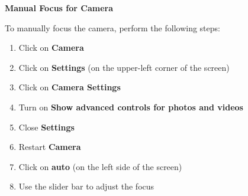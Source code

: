 \textbf{Manual Focus for Camera} \label{manual_focus}

To manually focus the camera, perform the following steps:

\begin{enumerate}
	\item Click on \textbf{Camera}

	\item Click on \textbf{Settings} (on the upper-left corner of the screen)

	\item Click on \textbf{Camera Settings}

	\item Turn on \textbf{Show advanced controls for photos and videos}

	\item Close \textbf{Settings}

	\item Restart \textbf{Camera}

	\item Click on \textbf{auto} (on the left side of the screen)

	\item Use the slider bar to adjust the focus
\end{enumerate} 
